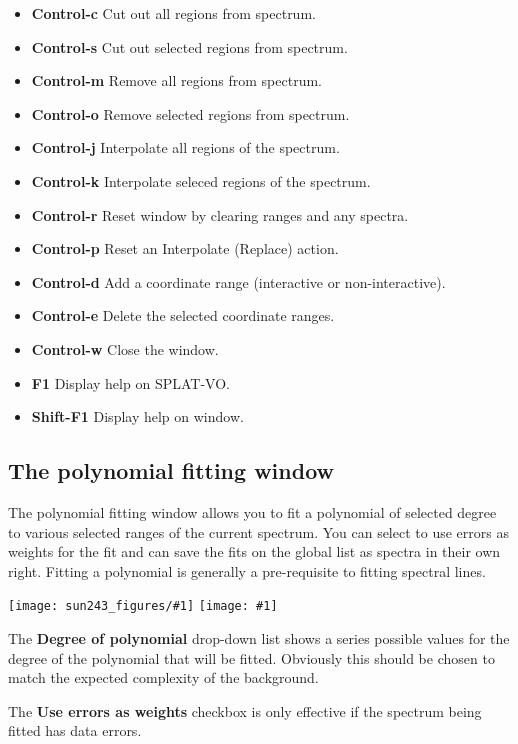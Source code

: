 \documentclass[twoside,11pt,nolof]{starlink}
\providecommand{\SPLAT}{\textsf{SPLAT-VO}}
\providecommand{\mainfigure}[1]
{\begin{center}
    \ifpdf
    \texttt{[image: sun243\_figures/\#1]}
    \else
    \texttt{[image: \#1]}
    \fi
 \end{center}
}
\newcommand{\labelitem}[1]{\textbf{#1}}
\begin{document}
\begin{itemize}
\item \labelitem{Control-c} Cut out all regions from spectrum.
\item \labelitem{Control-s} Cut out selected regions from spectrum.
\item \labelitem{Control-m} Remove all regions from spectrum.
\item \labelitem{Control-o} Remove selected regions from spectrum.
\item \labelitem{Control-j} Interpolate all regions of the spectrum.
\item \labelitem{Control-k} Interpolate seleced regions of the spectrum.
\item \labelitem{Control-r} Reset window by clearing ranges and any spectra.
\item \labelitem{Control-p} Reset an Interpolate (Replace) action.

\item \labelitem{Control-d} Add a coordinate range (interactive or non-interactive).
\item \labelitem{Control-e} Delete the selected coordinate ranges.

\item \labelitem{Control-w} Close the window.
\item \labelitem{F1} Display help on \SPLAT.
\item \labelitem{Shift-F1} Display help on window.
\end{itemize}


\newpage
\subsection{The polynomial fitting window}

The polynomial fitting window allows you to fit a polynomial of selected
degree to various selected ranges of the current spectrum. You can select to
use errors as weights for the fit and can save the fits on the global list as
spectra in their own right. Fitting a polynomial is generally a pre-requisite
to fitting spectral lines.

\mainfigure{polynomialfitwindow}

The \labelitem{Degree of polynomial} drop-down list shows a series
possible values for the degree of the polynomial that will be
fitted. Obviously this should be chosen to match the expected
complexity of the background.

The \labelitem{Use errors as weights} checkbox is only effective if
the spectrum being fitted has data errors.
\end{document}
